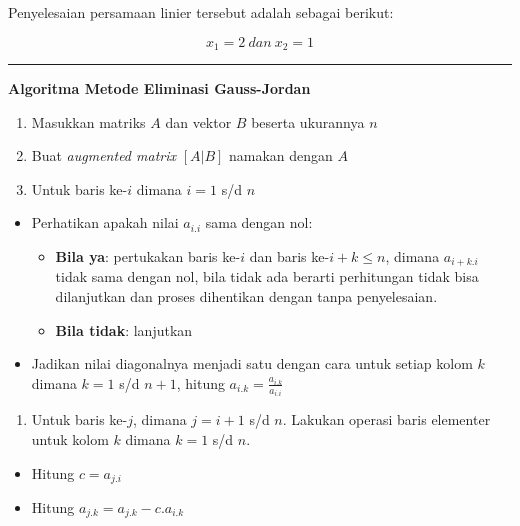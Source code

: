 \documentclass[]{book}
\providecommand{\tightlist}{%
  \setlength{\itemsep}{0pt}\setlength{\parskip}{0pt}}
\theoremstyle{definition}
\theoremstyle{definition}
\theoremstyle{definition}
\theoremstyle{remark}
\begin{document}
Penyelesaian persamaan linier tersebut adalah sebagai berikut:

\[
x_1=2\ dan\ x_2=1
\]

\begin{center}\rule{0.5\linewidth}{\linethickness}\end{center}

\textbf{Algoritma Metode Eliminasi Gauss-Jordan}

\begin{enumerate}
\def\labelenumi{\arabic{enumi}.}
\tightlist
\item
  Masukkan matriks \(A\) dan vektor \(B\) beserta ukurannya \(n\)
\item
  Buat \emph{augmented matrix} \(\left[A|B\right]\) namakan dengan \(A\)
\item
  Untuk baris ke-\(i\) dimana \(i=1\) s/d \(n\)
\end{enumerate}

\begin{itemize}
\item
  Perhatikan apakah nilai \(a_{i.i}\) sama dengan nol:

  \begin{itemize}
  \tightlist
  \item
    \textbf{Bila ya}: pertukakan baris ke-\(i\) dan baris ke-\(i+k\le n\), dimana \(a_{i+k.i}\) tidak sama dengan nol, bila tidak ada berarti perhitungan tidak bisa dilanjutkan dan proses dihentikan dengan tanpa penyelesaian.
  \item
    \textbf{Bila tidak}: lanjutkan
  \end{itemize}
\item
  Jadikan nilai diagonalnya menjadi satu dengan cara untuk setiap kolom \(k\) dimana \(k=1\) s/d \(n+1\), hitung \(a_{i.k}=\frac{a_{i.k}}{a_{i.i}}\)
\end{itemize}

\begin{enumerate}
\def\labelenumi{\arabic{enumi}.}
\setcounter{enumi}{3}
\tightlist
\item
  Untuk baris ke-\(j\), dimana \(j=i+1\) s/d \(n\). Lakukan operasi baris elementer untuk kolom \(k\) dimana \(k=1\) s/d \(n\).
\end{enumerate}

\begin{itemize}
\tightlist
\item
  Hitung \(c=a_{j.i}\)
\item
  Hitung \(a_{j.k}=a_{j.k}-c.a_{i.k}\)
\end{itemize}
\end{document}
